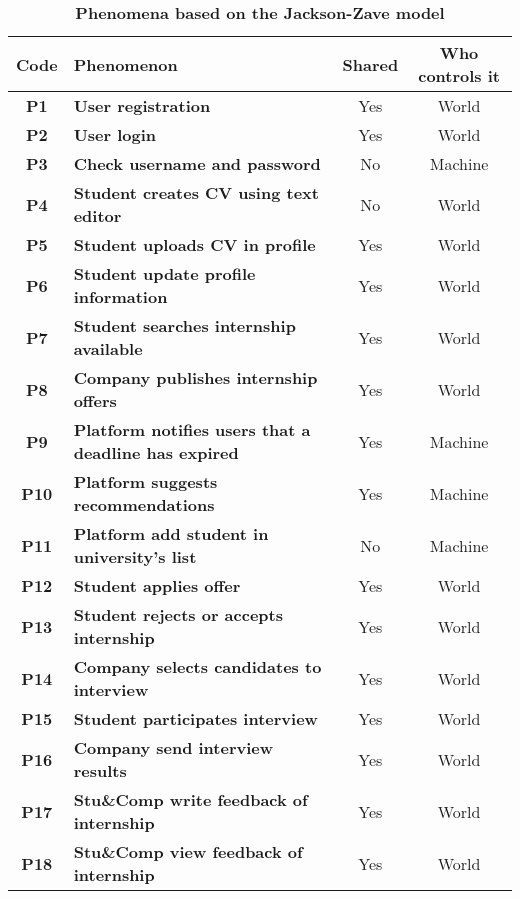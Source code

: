 \begin{table}[H]
    \caption*{\textbf{Phenomena based on the Jackson-Zave model}}
    \centering
    \begin{tabular}{|c|p{20em}|c|c|}
    \hline
    \rowcolor{bluepoli!40} %
    \textbf{Code} & \textbf{Phenomenon} & \textbf{Shared} & \textbf{Who controls it} \T\B \\
    \hline
    \textbf{P1} & \textbf{User registration} & Yes & World \T\B \\
    \textbf{P2} & \textbf{User login} & Yes & World \T\B\\
    \textbf{P3} & \textbf{Check username and password} & No & Machine \T\B\\
    \textbf{P4} & \textbf{Student creates CV using text editor} & No & World  \T\B \\
    \textbf{P5} & \textbf{Student uploads CV in profile} & Yes & World  \T\B \\
    \textbf{P6} & \textbf{Student update profile information} & Yes & World  \T\B \\
    \textbf{P7} & \textbf{Student searches internship available} & Yes & World \T\B\\
    \textbf{P8} & \textbf{Company publishes internship offers} & Yes & World \T\B \\
    \textbf{P9} & \textbf{Platform notifies users that a deadline has expired} & Yes & Machine \B\\
    \textbf{P10} & \textbf{Platform suggests recommendations} & Yes & Machine \T\B \\
    \textbf{P11} & \textbf{Platform add student in university's list} & No & Machine \T\B \\
    \textbf{P12} & \textbf{Student applies offer} & Yes & World \B\\
    \textbf{P13} & \textbf{Student rejects or accepts internship} & Yes & World \T\B \\
    \textbf{P14} & \textbf{Company selects candidates to interview} & Yes & World \T\B\\
    \textbf{P15} & \textbf{Student participates interview} & Yes & World \T\B \\
    \textbf{P16} & \textbf{Company send interview results} & Yes & World \B\\
    \textbf{P17} & \textbf{Stu\&Comp write feedback of internship} & Yes & World \T\B\\
    \textbf{P18} & \textbf{Stu\&Comp view feedback of internship} & Yes & World \B\\

\end{tabular}
\end{table}
